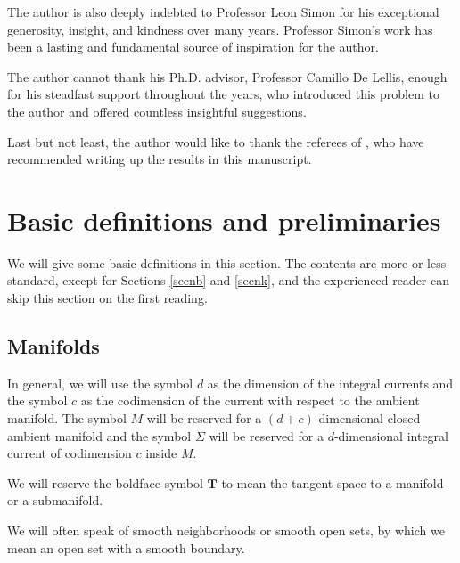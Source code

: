 \documentclass[11pt,a4paper]{amsart}
\numberwithin{equation}{section}
\newcommand{\Si}{\Sigma}
\theoremstyle{plain}
\theoremstyle{definition}
\numberwithin{equation}{subsection}
\begin{document}
	The author is also deeply indebted to Professor Leon Simon for his exceptional generosity, insight, and kindness over many years. Professor Simon’s work \cite{LSfr} has been a lasting and fundamental source of inspiration for the author.
	
	The author cannot thank his Ph.D. advisor, Professor Camillo De Lellis, enough for his steadfast support throughout the years, who introduced this problem to the author and offered countless insightful suggestions.	
	
	Last but not least, the author would like to thank the referees of \cite{ZLa}, who have recommended writing up the results in this manuscript.
	\section{Basic definitions and preliminaries}\label{bsdefn}
	We will give some basic definitions in this section. The contents are more or less standard, except for Sections \ref{secnb} and \ref{secnk}, and the experienced reader can skip this section on the first reading.
	\subsection{Manifolds}\label{bdmn}
	In general, we will use the symbol $d$ as the dimension of the integral currents and the symbol $c$ as the codimension of the current with respect to the ambient manifold. The symbol $M$ will be reserved for a $(d+c)$-dimensional closed ambient manifold and the symbol $\Si$ will be reserved for a $d$-dimensional integral current of codimension $c$ inside $M.$ %
	
	We will reserve the boldface symbol $\mathbf{T}$ to mean the tangent space to a manifold or a submanifold.
	
	We will often speak of smooth neighborhoods or smooth open sets, by which we mean an open set with a smooth boundary.%
	
\end{document}
